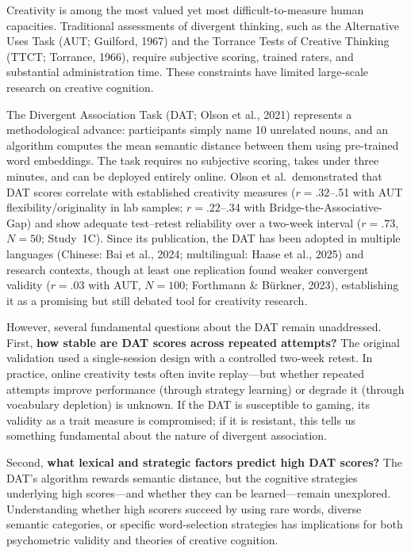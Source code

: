 \documentclass[12pt]{article}
\begin{document}
Creativity is among the most valued yet most difficult-to-measure human capacities. Traditional assessments of divergent thinking, such as the Alternative Uses Task (AUT; Guilford, 1967) and the Torrance Tests of Creative Thinking (TTCT; Torrance, 1966), require subjective scoring, trained raters, and substantial administration time. These constraints have limited large-scale research on creative cognition.

The Divergent Association Task (DAT; Olson et al., 2021) represents a methodological advance: participants simply name 10 unrelated nouns, and an algorithm computes the mean semantic distance between them using pre-trained word embeddings. The task requires no subjective scoring, takes under three minutes, and can be deployed entirely online. Olson et al.\ demonstrated that DAT scores correlate with established creativity measures ($r = .32$--.51 with AUT flexibility/originality in lab samples; $r = .22$--.34 with Bridge-the-Associative-Gap) and show adequate test--retest reliability over a two-week interval ($r = .73$, $N = 50$; Study~1C). Since its publication, the DAT has been adopted in multiple languages (Chinese: Bai et al., 2024; multilingual: Haase et al., 2025) and research contexts, though at least one replication found weaker convergent validity ($r = .03$ with AUT, $N = 100$; Forthmann \& B\"urkner, 2023), establishing it as a promising but still debated tool for creativity research.

However, several fundamental questions about the DAT remain unaddressed. First, \textbf{how stable are DAT scores across repeated attempts?} The original validation used a single-session design with a controlled two-week retest. In practice, online creativity tests often invite replay---but whether repeated attempts improve performance (through strategy learning) or degrade it (through vocabulary depletion) is unknown. If the DAT is susceptible to gaming, its validity as a trait measure is compromised; if it is resistant, this tells us something fundamental about the nature of divergent association.

Second, \textbf{what lexical and strategic factors predict high DAT scores?} The DAT's algorithm rewards semantic distance, but the cognitive strategies underlying high scores---and whether they can be learned---remain unexplored. Understanding whether high scorers succeed by using rare words, diverse semantic categories, or specific word-selection strategies has implications for both psychometric validity and theories of creative cognition.
\end{document}

